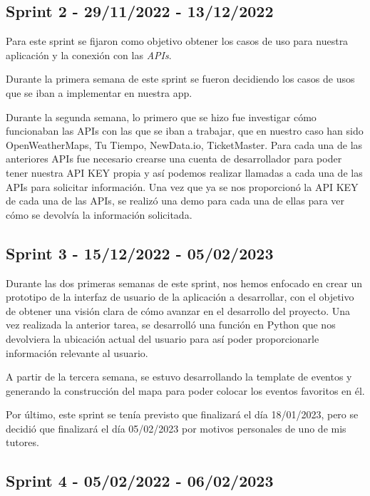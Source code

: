 \subsection{Sprint 2 - 29/11/2022 - 13/12/2022}

Para este sprint se fijaron como objetivo obtener los casos de uso para nuestra aplicación y la conexión con las \textit{APIs}.

Durante la primera semana de este sprint se fueron decidiendo los casos de usos que se iban a implementar en nuestra app.

Durante la segunda semana, lo primero que se hizo fue investigar cómo funcionaban las APIs con las que se iban a trabajar, que en nuestro caso han sido OpenWeatherMaps, Tu Tiempo, NewData.io, TicketMaster. Para cada una de las anteriores APIs fue necesario crearse una cuenta de desarrollador para poder tener nuestra API KEY propia y así podemos realizar llamadas a cada una de las APIs para solicitar información. Una vez que ya se nos proporcionó la API KEY de cada una de las APIs, se realizó una demo para cada una de ellas para ver cómo se devolvía la información solicitada. 



\subsection{Sprint 3 - 15/12/2022 - 05/02/2023}

Durante las dos primeras semanas de este sprint, nos hemos enfocado en crear un prototipo de la interfaz de usuario de la aplicación a desarrollar, con el objetivo de obtener una visión clara de cómo avanzar en el desarrollo del proyecto. Una vez realizada la anterior tarea, se desarrolló una función en Python que nos devolviera la ubicación actual del usuario para así poder proporcionarle información relevante al usuario.

A partir de la tercera semana, se estuvo desarrollando la template de eventos y generando la construcción del mapa para poder colocar los eventos favoritos en él.

Por último, este sprint se tenía previsto que finalizará el día 18/01/2023, pero se decidió que finalizará el día 05/02/2023 por motivos personales de uno de mis tutores.


\subsection{Sprint 4 - 05/02/2022 - 06/02/2023}

